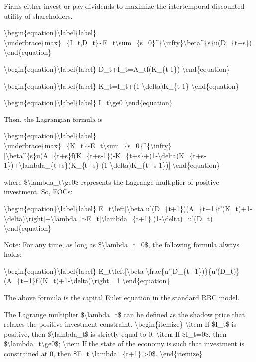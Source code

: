 \documentclass[10pt,math=newtx,citestyle=gb7714-2015,bibstyle=gb7714-2015]{elegantbook}
\begin{document}
	Firms either invest or pay dividends to maximize the intertemporal discounted utility of shareholders.
	
	\textbackslash{}begin\{equation\}\textbackslash{}label\{label\}
	\textbackslash{}underbrace\{max\}\_\{I\_t,D\_t\}\~{}E\_t\textbackslash{}sum\_\{s=0\}\^{}\{\textbackslash{}infty\}\textbackslash{}beta\^{}\{s\}u(D\_\{t+s\})
	\textbackslash{}end\{equation\}
	
	\textbackslash{}begin\{equation\}\textbackslash{}label\{label\}
	D\_t+I\_t=A\_tf(K\_\{t-1\})
	\textbackslash{}end\{equation\}
	
	\textbackslash{}begin\{equation\}\textbackslash{}label\{label\}
	K\_t=I\_t+(1-\textbackslash{}delta)K\_\{t-1\}
	\textbackslash{}end\{equation\}
	
	\textbackslash{}begin\{equation\}\textbackslash{}label\{label\}
	I\_t\textbackslash{}ge0
	\textbackslash{}end\{equation\}
	
	Then, the Lagrangian formula is
	
	\textbackslash{}begin\{equation\}\textbackslash{}label\{label\}
	\textbackslash{}underbrace\{max\}\_\{K\_t\}\~{}E\_t\textbackslash{}sum\_\{s=0\}\^{}\{\textbackslash{}infty\}[\textbackslash{}beta\^{}\{s\}u(A\_\{t+s\}f(K\_\{t+s-1\})-K\_\{t+s\}+(1-\textbackslash{}delta)K\_\{t+s-1\})+\textbackslash{}lambda\_\{t+s\}(K\_\{t+s\}-(1-\textbackslash{}delta)K\_\{t+s-1\})]
	\textbackslash{}end\{equation\}
	
	where  \$\textbackslash{}lambda\_t\textbackslash{}ge0\$ represents the Lagrange multiplier of positive investment. So, FOCs:
	
	\textbackslash{}begin\{equation\}\textbackslash{}label\{label\}
	E\_t\textbackslash{}left[\textbackslash{}beta u'(D\_\{t+1\})(A\_\{t+1\}f'(K\_t)+1-\textbackslash{}delta)\textbackslash{}right]+\textbackslash{}lambda\_t-E\_t[\textbackslash{}lambda\_\{t+1\}](1-\textbackslash{}delta)=u'(D\_t)
	\textbackslash{}end\{equation\}
	
	Note: For any time, as long as \$\textbackslash{}lambda\_t=0\$, the following formula always holds:
	
	\textbackslash{}begin\{equation\}\textbackslash{}label\{label\}
	E\_t\textbackslash{}left[\textbackslash{}beta \textbackslash{}frac\{u'(D\_\{t+1\})\}\{u'(D\_t)\}(A\_\{t+1\}f'(K\_t)+1-\textbackslash{}delta)\textbackslash{}right]=1
	\textbackslash{}end\{equation\}
	
	The above formula is the capital Euler equation in the standard RBC model.
	
	The Lagrange multiplier \$\textbackslash{}lambda\_t\$ can be defined as the shadow price that relaxes the positive investment constraint.
	\textbackslash{}begin\{itemize\}
	\textbackslash{}item If \$I\_t\$ is positive, then \$\textbackslash{}lambda\_t\$ is strictly equal to 0;
	\textbackslash{}item If \$I\_t=0\$, then \$\textbackslash{}lambda\_t\textbackslash{}ge0\$;
	\textbackslash{}item If the state of the economy is such that investment is constrained at 0, then \$E\_t[\textbackslash{}lambda\_\{t+1\}]>0\$.
	\textbackslash{}end\{itemize\}
	
\end{document}
